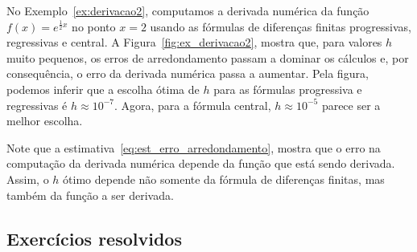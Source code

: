 \begin{ex}
No Exemplo~\ref{ex:derivacao2}, computamos a derivada numérica da função $f(x)=e^{\frac{1}{2}x}$ no ponto $x=2$ usando as fórmulas de diferenças finitas progressivas, regressivas e central. A Figura~\ref{fig:ex_derivacao2}, mostra que, para valores $h$ muito pequenos, os erros de arredondamento passam a dominar os cálculos e, por consequência, o erro da derivada numérica passa a aumentar. Pela figura, podemos inferir que a escolha ótima de $h$ para as fórmulas progressiva e regressivas é $h\approx 10^{-7}$. Agora, para a fórmula central, $h\approx 10^{-5}$ parece ser a melhor escolha.
\end{ex}

\begin{obs}
  Note que a estimativa~\eqref{eq:est_erro_arredondamento}, mostra que o erro na computação da derivada numérica depende da função que está sendo derivada. Assim, o $h$ ótimo depende não somente da fórmula de diferenças finitas, mas também da função a ser derivada.
\end{obs}

\subsection*{Exercícios resolvidos}

